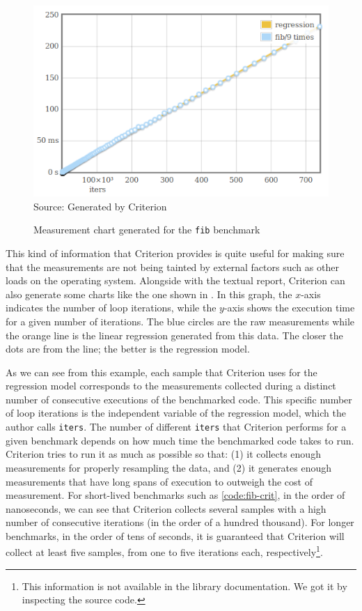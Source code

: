 \begin{figure}[htp]
  \centering
  \caption{Measurement chart generated for the \texttt{fib} benchmark}
  \includegraphics[width=.6\columnwidth]{images/criterion-chart} \\
  \footnotesize{Source: Generated by Criterion}
  \label{fig:crit-chart}
\end{figure}

This kind of information that Criterion provides is quite useful for making sure that the measurements are not being tainted by external factors such as other loads on the operating system. Alongside with the textual report, Criterion can also generate some charts like the one shown in . In this graph, the $x$-axis indicates the number of loop iterations, while the $y$-axis shows the execution time for a given number of iterations. The blue circles are the raw measurements while the orange line is the linear regression generated from this data. The closer the dots are from the line; the better is the regression model.

As we can see from this example, each sample that Criterion uses for the regression model corresponds to the measurements collected during a distinct number of consecutive executions of the benchmarked code. This specific number of loop iterations is the independent variable of the regression model, which the author calls \texttt{iters}. The number of different \texttt{iters} that Criterion performs for a given benchmark depends on how much time the benchmarked code takes to run. Criterion tries to run it as much as possible so that: (1) it collects enough measurements for properly resampling the data, and (2) it generates enough measurements that have long spans of execution to outweigh the cost of measurement. For short-lived benchmarks such as \autoref{code:fib-crit}, in the order of nanoseconds, we can see that Criterion collects several samples with a high number of consecutive iterations (in the order of a hundred thousand). For longer benchmarks, in the order of tens of seconds, it is guaranteed that Criterion will collect at least five samples, from one to five iterations each, respectively\footnote{This information is not available in the library documentation. We got it by inspecting the source code.}.

